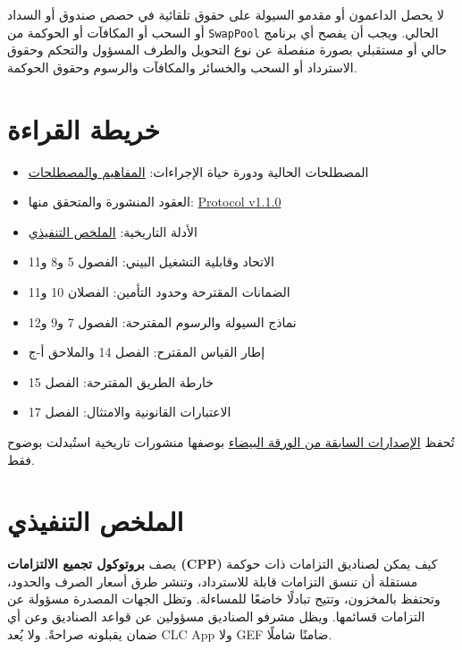 \documentclass[11pt]{article}
\begin{document}
لا يحصل الداعمون أو مقدمو السيولة على حقوق تلقائية في حصص صندوق أو السداد أو السحب أو المكافآت أو الحوكمة من \texttt{SwapPool} الحالي. ويجب أن يفصح أي برنامج حالي أو مستقبلي بصورة منفصلة عن نوع التحويل والطرف المسؤول والتحكم وحقوق الاسترداد أو السحب والخسائر والمكافآت والرسوم وحقوق الحوكمة.

\section*{خريطة القراءة}

\begin{itemize}[leftmargin=*]
\item المصطلحات الحالية ودورة حياة الإجراءات: \href{https://docs.cosmolocal.credit/ar/introduction/concepts}{المفاهيم والمصطلحات}
\item العقود المنشورة والمتحقق منها: \href{https://docs.cosmolocal.credit/ar/protocol/overview}{Protocol v1.1.0}
\item الأدلة التاريخية: \href{https://docs.cosmolocal.credit/ar/white-paper/executive-summary}{الملخص التنفيذي}
\item الاتحاد وقابلية التشغيل البيني: الفصول 5 و8 و11
\item الضمانات المقترحة وحدود التأمين: الفصلان 10 و11
\item نماذج السيولة والرسوم المقترحة: الفصول 7 و9 و12
\item إطار القياس المقترح: الفصل 14 والملاحق أ-ج
\item خارطة الطريق المقترحة: الفصل 15
\item الاعتبارات القانونية والامتثال: الفصل 17
\end{itemize}
تُحفظ \href{https://docs.cosmolocal.credit/ar/white-paper/archive}{الإصدارات السابقة من الورقة البيضاء} بوصفها منشورات تاريخية استُبدلت بوضوح فقط.

\section*{الملخص التنفيذي}

يصف \textbf{بروتوكول تجميع الالتزامات (CPP)} كيف يمكن لصناديق التزامات ذات حوكمة مستقلة أن تنسق التزامات قابلة للاسترداد، وتنشر طرق أسعار الصرف والحدود، وتحتفظ بالمخزون، وتتيح تبادلًا خاضعًا للمساءلة. وتظل الجهات المصدرة مسؤولة عن التزامات قسائمها. ويظل مشرفو الصناديق مسؤولين عن قواعد الصناديق وعن أي ضمان يقبلونه صراحةً. ولا يُعد CLC App ولا GEF ضامنًا شاملًا.
\end{document}
